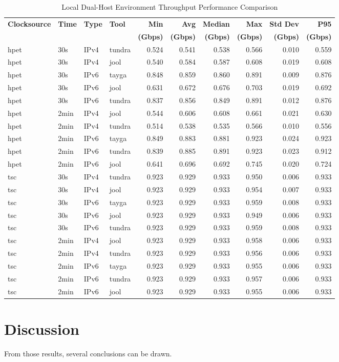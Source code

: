 \begin{table}[htbp]
\centering
\caption{Local Dual-Host Environment Throughput Performance Comparison}
\label{tab:throughput_comparison_localdouble}
\footnotesize
\begin{tabular}{|l|l|l|l|r|r|r|r|r|r|}
\hline
\textbf{Clocksource} & \textbf{Time} & \textbf{Type} & \textbf{Tool} & \textbf{Min} & \textbf{Avg} & \textbf{Median} & \textbf{Max} & \textbf{Std Dev} & \textbf{P95} \\
 & & & & \textbf{(Gbps)} & \textbf{(Gbps)} & \textbf{(Gbps)} & \textbf{(Gbps)} & \textbf{(Gbps)} & \textbf{(Gbps)} \\
\hline
hpet & 30s & IPv4 & tundra & 0.524 & 0.541 & 0.538 & 0.566 & 0.010 & 0.559 \\
hpet & 30s & IPv4 & jool & 0.540 & 0.584 & 0.587 & 0.608 & 0.019 & 0.608 \\
hpet & 30s & IPv6 & tayga & 0.848 & 0.859 & 0.860 & 0.891 & 0.009 & 0.876 \\
hpet & 30s & IPv6 & jool & 0.631 & 0.672 & 0.676 & 0.703 & 0.019 & 0.692 \\
hpet & 30s & IPv6 & tundra & 0.837 & 0.856 & 0.849 & 0.891 & 0.012 & 0.876 \\
hpet & 2min & IPv4 & jool & 0.544 & 0.606 & 0.608 & 0.661 & 0.021 & 0.630 \\
hpet & 2min & IPv4 & tundra & 0.514 & 0.538 & 0.535 & 0.566 & 0.010 & 0.556 \\
hpet & 2min & IPv6 & tayga & 0.849 & 0.883 & 0.881 & 0.923 & 0.024 & 0.923 \\
hpet & 2min & IPv6 & tundra & 0.839 & 0.885 & 0.891 & 0.923 & 0.023 & 0.912 \\
hpet & 2min & IPv6 & jool & 0.641 & 0.696 & 0.692 & 0.745 & 0.020 & 0.724 \\
\hline
tsc & 30s & IPv4 & tundra & 0.923 & 0.929 & 0.933 & 0.950 & 0.006 & 0.933 \\
tsc & 30s & IPv4 & jool & 0.923 & 0.929 & 0.933 & 0.954 & 0.007 & 0.933 \\
tsc & 30s & IPv6 & tayga & 0.923 & 0.929 & 0.933 & 0.959 & 0.008 & 0.933 \\
tsc & 30s & IPv6 & jool & 0.923 & 0.929 & 0.933 & 0.949 & 0.006 & 0.933 \\
tsc & 30s & IPv6 & tundra & 0.923 & 0.929 & 0.933 & 0.959 & 0.008 & 0.933 \\
tsc & 2min & IPv4 & jool & 0.923 & 0.929 & 0.933 & 0.958 & 0.006 & 0.933 \\
tsc & 2min & IPv4 & tundra & 0.923 & 0.929 & 0.933 & 0.956 & 0.006 & 0.933 \\
tsc & 2min & IPv6 & tayga & 0.923 & 0.929 & 0.933 & 0.955 & 0.006 & 0.933 \\
tsc & 2min & IPv6 & tundra & 0.923 & 0.929 & 0.933 & 0.957 & 0.006 & 0.933 \\
tsc & 2min & IPv6 & jool & 0.923 & 0.929 & 0.933 & 0.955 & 0.006 & 0.933 \\
\hline
\end{tabular}
\end{table}

\section{Discussion}

From those results, several conclusions can be drawn. 
